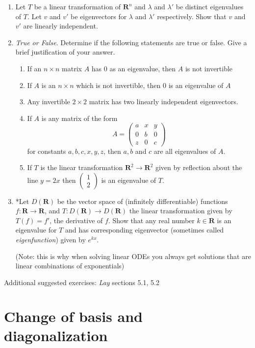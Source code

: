 \documentclass[12pt]{article}
\numberwithin{equation}{subsection}
\numberwithin{figure}{subsection}
\theoremstyle{note}
\newcommand{\R}{\mathbf{R}}
\begin{document}
\begin{enumerate}[label=\arabic*.]
	\item Let $T$ be a linear transformation of $\R^n$ and $\lambda$ and $\lambda'$ be distinct eigenvalues of $T$. Let $v$ and $v'$ be eigenvectors for $\lambda$ and $\lambda'$ respectively. Show that $v$ and $v'$ are linearly independent. 
	\item \textit{True or False}. Determine if the following statements are true or false. Give a brief justification of your answer. 
	\begin{enumerate}
		\item If an $n\times n$ matrix $A$ has $0$ as an eigenvalue, then $A$ is not invertible
		\item If $A$ is an $n \times n$ which is not invertible, then $0$ is an eigenvalue of $A$
		\item Any invertible $2\times 2$ matrix has  two  linearly independent eigenvectors.
		\item If $A$ is any matrix of the form \[A=\begin{pmatrix} a & x & y \\ 0 & b & 0 \\ z & 0 & c\end{pmatrix}\] for constants $a,b,c,x,y,z$, then $a,b$ and $c$ are all eigenvalues of $A$.
		\item If $T$ is the linear transformation $\mathbf{R}^2\to\mathbf{R}^2$ given by reflection about the line $y=2x$ then $\begin{pmatrix} 1 \\ 2\end{pmatrix}$ is an eigenvalue of $T$.
		\end{enumerate}
		
		\item *Let $D(\R)$ be the vector space of (infinitely differentiable) functions $f\colon \R \to \R$, and $T\colon D(\R)\to D(\R)$ the linear transformation given by $T(f)=f'$, the derivative of $f$. Show that any real number $k\in \R$ is an eigenvalue for $T$ and has corresponding eigenvector (sometimes called \textit{eigenfunction}) given by $e^{kx}$. 
		
		(Note: this is why when solving linear ODEs you always get solutions that are linear combinations of exponentials)
\end{enumerate}

Additional suggested exercises: \textit{Lay} sections 5.1, 5.2


\section[Diagonalization]{Change of basis and diagonalization}
\end{document}
